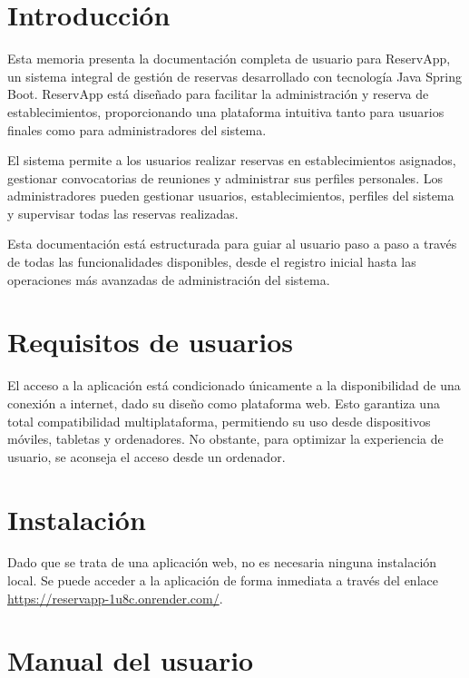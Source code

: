 
\section{Introducción}
Esta memoria presenta la documentación completa de usuario para ReservApp, un sistema integral de gestión de reservas desarrollado con tecnología Java Spring Boot. ReservApp está diseñado para facilitar la administración y reserva de establecimientos, proporcionando una plataforma intuitiva tanto para usuarios finales como para administradores del sistema.

El sistema permite a los usuarios realizar reservas en establecimientos asignados, gestionar convocatorias de reuniones y administrar sus perfiles personales. Los administradores pueden gestionar usuarios, establecimientos, perfiles del sistema y supervisar todas las reservas realizadas.

Esta documentación está estructurada para guiar al usuario paso a paso a través de todas las funcionalidades disponibles, desde el registro inicial hasta las operaciones más avanzadas de administración del sistema.

\section{Requisitos de usuarios}
El acceso a la aplicación está condicionado únicamente a la disponibilidad de una conexión a internet, dado su diseño como plataforma web. Esto garantiza una total compatibilidad multiplataforma, permitiendo su uso desde dispositivos móviles, tabletas y ordenadores. No obstante, para optimizar la experiencia de usuario, se aconseja el acceso desde un ordenador.

\section{Instalación}
Dado que se trata de una aplicación web, no es necesaria ninguna instalación local. Se puede acceder a la aplicación de forma inmediata a través del enlace \url{https://reservapp-1u8c.onrender.com/}.

\section{Manual del usuario}


